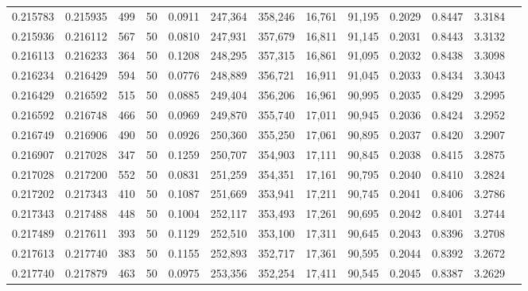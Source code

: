 \begin{tabular}{rrrrrrrrrrrrr}
0.215783 & 0.215935 &   499 &  50 &                                     0.0911 & 247,364 & 358,246 &  16,761 &  91,195 & 0.2029 & 0.8447 & 3.3184 \\
0.215936 & 0.216112 &   567 &  50 &                                     0.0810 & 247,931 & 357,679 &  16,811 &  91,145 & 0.2031 & 0.8443 & 3.3132 \\
0.216113 & 0.216233 &   364 &  50 &                                     0.1208 & 248,295 & 357,315 &  16,861 &  91,095 & 0.2032 & 0.8438 & 3.3098 \\
0.216234 & 0.216429 &   594 &  50 &                                     0.0776 & 248,889 & 356,721 &  16,911 &  91,045 & 0.2033 & 0.8434 & 3.3043 \\
0.216429 & 0.216592 &   515 &  50 &                                     0.0885 & 249,404 & 356,206 &  16,961 &  90,995 & 0.2035 & 0.8429 & 3.2995 \\
0.216592 & 0.216748 &   466 &  50 &                                     0.0969 & 249,870 & 355,740 &  17,011 &  90,945 & 0.2036 & 0.8424 & 3.2952 \\
0.216749 & 0.216906 &   490 &  50 &                                     0.0926 & 250,360 & 355,250 &  17,061 &  90,895 & 0.2037 & 0.8420 & 3.2907 \\
0.216907 & 0.217028 &   347 &  50 &                                     0.1259 & 250,707 & 354,903 &  17,111 &  90,845 & 0.2038 & 0.8415 & 3.2875 \\
0.217028 & 0.217200 &   552 &  50 &                                     0.0831 & 251,259 & 354,351 &  17,161 &  90,795 & 0.2040 & 0.8410 & 3.2824 \\
0.217202 & 0.217343 &   410 &  50 &                                     0.1087 & 251,669 & 353,941 &  17,211 &  90,745 & 0.2041 & 0.8406 & 3.2786 \\
0.217343 & 0.217488 &   448 &  50 &                                     0.1004 & 252,117 & 353,493 &  17,261 &  90,695 & 0.2042 & 0.8401 & 3.2744 \\
0.217489 & 0.217611 &   393 &  50 &                                     0.1129 & 252,510 & 353,100 &  17,311 &  90,645 & 0.2043 & 0.8396 & 3.2708 \\
0.217613 & 0.217740 &   383 &  50 &                                     0.1155 & 252,893 & 352,717 &  17,361 &  90,595 & 0.2044 & 0.8392 & 3.2672 \\
0.217740 & 0.217879 &   463 &  50 &                                     0.0975 & 253,356 & 352,254 &  17,411 &  90,545 & 0.2045 & 0.8387 & 3.2629 \\

\end{tabular}
